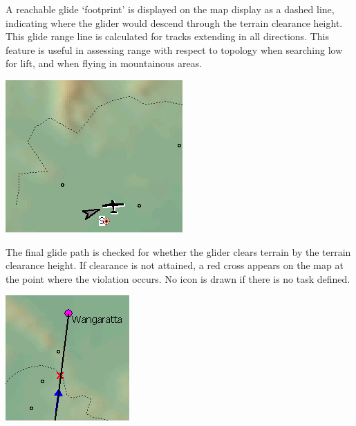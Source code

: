 \documentclass[a4paper,12pt]{refrep}
\begin{document}
A reachable glide `footprint' is displayed on the map display as a
dashed line, indicating where the glider would descend through the
terrain clearance height.  This glide range line is calculated for
tracks extending in all directions.  This feature is useful in
assessing range with respect to topology when searching low for lift,
and when flying in mountainous areas.

\begin{center}
\includegraphics[angle=0,width=0.7\linewidth,keepaspectratio='true']{figures/cut-footprint.png}


\end{center}

The final glide path is checked for whether the glider clears terrain
by the terrain clearance height.  If clearance is not attained, a red
cross appears on the map at the point where the violation occurs.  No
icon is drawn if there is no task defined.

\begin{center}
\includegraphics[angle=0,width=0.6\linewidth,keepaspectratio='true']{figures/cut-fgtt.png}
%
%
\end{center}
\end{document}
